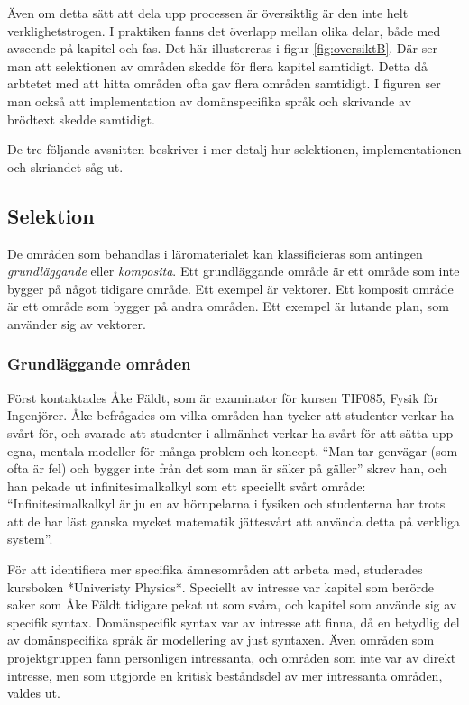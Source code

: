 \begin{binge}
Även om detta sätt att dela upp processen är översiktlig är den inte helt verklighetstrogen. I praktiken fanns det överlapp mellan olika delar, både med avseende på kapitel och fas. Det här illustereras i figur \ref{fig:oversiktB}. Där ser man att selektionen av områden skedde för flera kapitel samtidigt. Detta då arbtetet med att hitta områden ofta gav flera områden samtidigt. I figuren ser man också att implementation av domänspecifika språk och skrivande av brödtext skedde samtidigt.

De tre följande avsnitten beskriver i mer detalj hur selektionen, implementationen och skriandet såg ut.

\subsection{Selektion}


De områden som behandlas i läromaterialet kan klassificieras som antingen \textit{grundläggande} eller \textit{komposita}. Ett grundläggande område är ett område som inte bygger på något tidigare område. Ett exempel är vektorer. Ett komposit område är ett område som bygger på andra områden. Ett exempel är lutande plan, som använder sig av vektorer.

\subsubsection{Grundläggande områden}

  Först kontaktades Åke Fäldt, som är examinator för kursen TIF085,
  Fysik för Ingenjörer. Åke befrågades om vilka områden han tycker att
  studenter verkar ha svårt för, och svarade att studenter i allmänhet
  verkar ha svårt för att sätta upp egna, mentala modeller för många
  problem och koncept. ``Man tar genvägar (som ofta är fel) och bygger
  inte från det som man är säker på gäller'' skrev han, och han pekade
  ut infinitesimalkalkyl som ett speciellt svårt område:
  ``Infinitesimalkalkyl är ju en av hörnpelarna i fysiken och
  studenterna har trots att de har läst ganska mycket matematik
  jättesvårt att använda detta på verkliga system''.

  För att identifiera mer specifika ämnesområden att arbeta med,
  studerades kursboken *Univeristy Physics*. Speciellt av intresse var
  kapitel som berörde saker som Åke Fäldt tidigare pekat ut som svåra,
  och kapitel som använde sig av specifik syntax. Domänspecifik syntax
  var av intresse att finna, då en betydlig del av domänspecifika språk
  är modellering av just syntaxen. Även områden som projektgruppen fann
  personligen intressanta, och områden som inte var av direkt intresse,
  men som utgjorde en kritisk beståndsdel av mer intressanta områden,
  valdes ut.


\end{binge}
